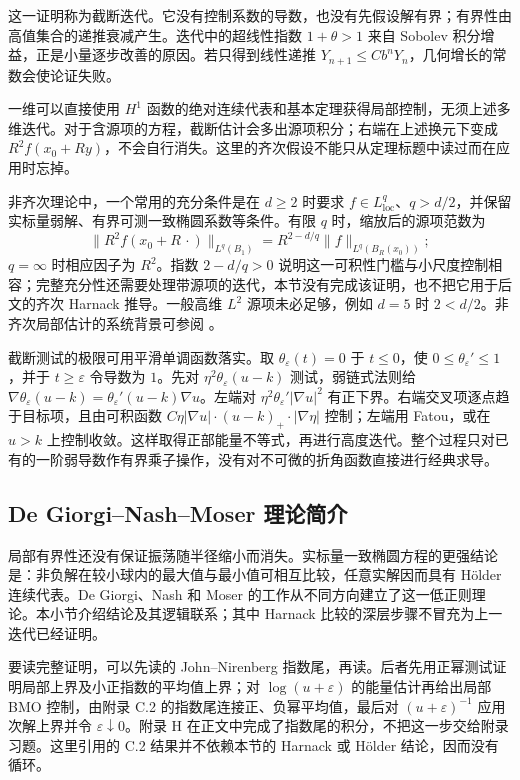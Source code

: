 这一证明称为截断迭代。它没有控制系数的导数，也没有先假设解有界；有界性由高值集合的递推衰减产生。迭代中的超线性指数 \(1+\theta>1\) 来自 Sobolev 积分增益，正是小量逐步改善的原因。若只得到线性递推 \(Y_{n+1}\le Cb^nY_n\)，几何增长的常数会使论证失败。

\ProseParagraphBreak

一维可以直接使用 \(H^1\) 函数的绝对连续代表和基本定理获得局部控制，无须上述多维迭代。对于含源项的方程，截断估计会多出源项积分；右端在上述换元下变成 \(R^2f(x_0+Ry)\)，不会自行消失。这里的齐次假设不能只从定理标题中读过而在应用时忘掉。

非齐次理论中，一个常用的充分条件是在 \(d\geq2\) 时要求 \(f\in L^q_{\mathrm{loc}}\)、\(q>d/2\)，并保留实标量弱解、有界可测一致椭圆系数等条件。有限 \(q\) 时，缩放后的源项范数为
\[\|R^2f(x_0+R\,\cdot)\|_{L^q(B_1)}
 =R^{2-d/q}\|f\|_{L^q(B_R(x_0))};\]
\(q=\infty\) 时相应因子为 \(R^2\)。指数 \(2-d/q>0\) 说明这一可积性门槛与小尺度控制相容；完整充分性还需要处理带源项的迭代，本节没有完成该证明，也不把它用于后文的齐次 Harnack 推导。一般高维 \(L^2\) 源项未必足够，例如 \(d=5\) 时 \(2<d/2\)。非齐次局部估计的系统背景可参阅 \cite[Chapter 8]{Gilbarg2001Elliptic}。

截断测试的极限可用平滑单调函数落实。取 \(\theta_\varepsilon(t)=0\) 于 \(t\le0\)，使 \(0\le\theta_\varepsilon'\le1\)，并于 \(t\ge\varepsilon\) 令导数为 \(1\)。先对 \(\eta^2\theta_\varepsilon(u-k)\) 测试，弱链式法则给 \(\nabla\theta_\varepsilon(u-k)=\theta_\varepsilon'(u-k)\nabla u\)。左端对 \(\eta^2\theta_\varepsilon'|\nabla u|^2\) 有正下界。右端交叉项逐点趋于目标项，且由可积函数 \(C\eta|\nabla u|\cdot(u-k)_+\cdot|\nabla\eta|\) 控制；左端用 Fatou，或在 \(u>k\) 上控制收敛。这样取得正部能量不等式，再进行高度迭代。整个过程只对已有的一阶弱导数作有界乘子操作，没有对不可微的折角函数直接进行经典求导。

\subsection{De Giorgi–Nash–Moser 理论简介}
\label{b2:subsec:160404}

局部有界性还没有保证振荡随半径缩小而消失。实标量一致椭圆方程的更强结论是：非负解在较小球内的最大值与最小值可相互比较，任意实解因而具有 Hölder 连续代表。De Giorgi、Nash 和 Moser 的工作从不同方向建立了这一低正则理论。本小节介绍结论及其逻辑联系；其中 Harnack 比较的深层步骤不冒充为上一迭代已经证明。

要读完整证明，可以先读的 John--Nirenberg 指数尾，再读。后者先用正幂测试证明局部上界及小正指数的平均值上界；对 \(\log(u+\varepsilon)\) 的能量估计再给出局部 BMO 控制，由附录 C.2 的指数尾连接正、负幂平均值，最后对 \((u+\varepsilon)^{-1}\) 应用次解上界并令 \(\varepsilon\downarrow0\)。附录 H 在正文中完成了指数尾的积分，不把这一步交给附录习题。这里引用的 C.2 结果并不依赖本节的 Harnack 或 Hölder 结论，因而没有循环。

